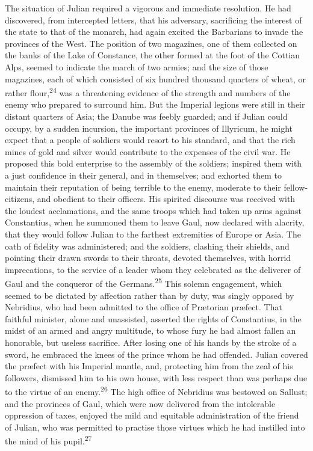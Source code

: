 The situation of Julian required a vigorous and immediate
resolution. He had discovered, from intercepted letters, that his
adversary, sacrificing the interest of the state to that of the
monarch, had again excited the Barbarians to invade the provinces
of the West. The position of two magazines, one of them collected
on the banks of the Lake of Constance, the other formed at the
foot of the Cottian Alps, seemed to indicate the march of two
armies; and the size of those magazines, each of which consisted
of six hundred thousand quarters of wheat, or rather flour,\textsuperscript{24}
was a threatening evidence of the strength and numbers of the
enemy who prepared to surround him. But the Imperial legions were
still in their distant quarters of Asia; the Danube was feebly
guarded; and if Julian could occupy, by a sudden incursion, the
important provinces of Illyricum, he might expect that a people
of soldiers would resort to his standard, and that the rich mines
of gold and silver would contribute to the expenses of the civil
war. He proposed this bold enterprise to the assembly of the
soldiers; inspired them with a just confidence in their general,
and in themselves; and exhorted them to maintain their reputation
of being terrible to the enemy, moderate to their
fellow-citizens, and obedient to their officers. His spirited
discourse was received with the loudest acclamations, and the
same troops which had taken up arms against Constantius, when he
summoned them to leave Gaul, now declared with alacrity, that
they would follow Julian to the farthest extremities of Europe or
Asia. The oath of fidelity was administered; and the soldiers,
clashing their shields, and pointing their drawn swords to their
throats, devoted themselves, with horrid imprecations, to the
service of a leader whom they celebrated as the deliverer of Gaul
and the conqueror of the Germans.\textsuperscript{25} This solemn engagement,
which seemed to be dictated by affection rather than by duty, was
singly opposed by Nebridius, who had been admitted to the office
of Prætorian præfect. That faithful minister, alone and
unassisted, asserted the rights of Constantius, in the midst of
an armed and angry multitude, to whose fury he had almost fallen
an honorable, but useless sacrifice. After losing one of his
hands by the stroke of a sword, he embraced the knees of the
prince whom he had offended. Julian covered the præfect with his
Imperial mantle, and, protecting him from the zeal of his
followers, dismissed him to his own house, with less respect than
was perhaps due to the virtue of an enemy.\textsuperscript{26} The high office of
Nebridius was bestowed on Sallust; and the provinces of Gaul,
which were now delivered from the intolerable oppression of
taxes, enjoyed the mild and equitable administration of the
friend of Julian, who was permitted to practise those virtues
which he had instilled into the mind of his pupil.\textsuperscript{27}


